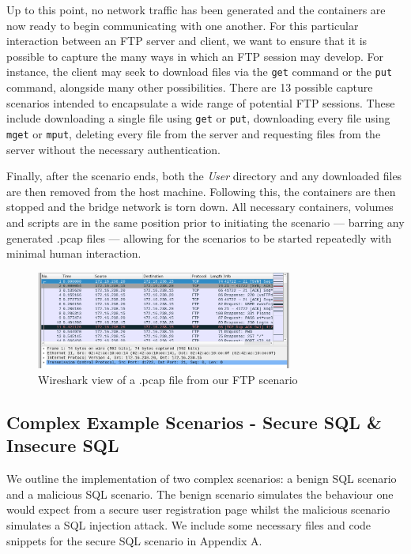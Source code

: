 \documentclass[msc,deptreport, cs]{infthesis} %
\begin{document}
    Up to this point, no network traffic has been generated and the containers are now ready to begin communicating with one another. 
    For this particular interaction between an FTP server and client, we want to ensure that it is possible to capture the many ways in which an FTP session may develop. For instance, the client may seek to download files via the \texttt{get} command or the \texttt{put} command, alongside many other possibilities. There are 13 possible capture scenarios intended to encapsulate a wide range of potential FTP sessions. These include downloading a single file using \texttt{get} or \texttt{put}, downloading every file using \texttt{mget} or \texttt{mput}, deleting every file from the server and requesting files from the server without the necessary authentication.

    Finally, after the scenario ends, both the \textit{User} directory and any downloaded files are then removed from the host machine. Following this, the containers are then stopped and the bridge network is torn down. All necessary containers, volumes and scripts are in the same position prior to initiating the scenario --- barring any generated .pcap files --- allowing for the scenarios to be started repeatedly with minimal human interaction.
    
    \begin{figure}[H]
\centering
\includegraphics[width=0.75\textwidth]{pcap.png}
\caption{Wireshark view of a .pcap file from our FTP scenario}
\end{figure}
    

\subsection{Complex Example Scenarios - Secure SQL \& Insecure SQL}

We outline the implementation of two complex scenarios: a benign SQL scenario and a malicious SQL scenario. The benign scenario simulates the behaviour one would expect from a secure user registration page whilst the malicious scenario simulates a SQL injection attack. We include some necessary files and code snippets for the secure SQL scenario in Appendix A.
\end{document}
